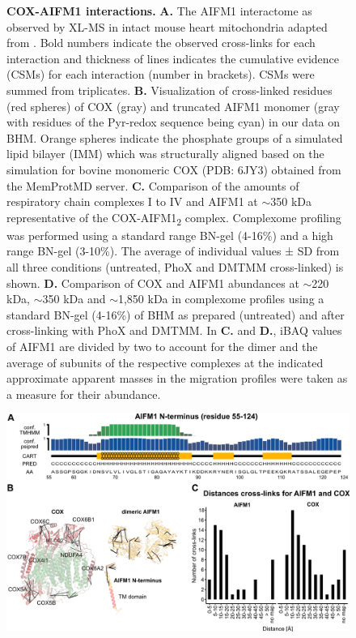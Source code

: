 \begin{subappendices}
\begin{figure}[htb]
		\caption{\textbf{COX-AIFM1 interactions.} \textbf{A.} The AIFM1 interactome as observed by XL-MS in intact mouse heart mitochondria adapted from \cite{RN16}. Bold numbers indicate the observed cross-links for each interaction and thickness of lines indicates the cumulative evidence (CSMs) for each interaction (number in brackets). CSMs were summed from triplicates. \textbf{B.} Visualization of cross-linked residues (red spheres) of COX (gray) and truncated AIFM1 monomer (gray with residues of the Pyr-redox sequence being cyan) in our data on BHM. Orange spheres indicate the phosphate groups of a simulated lipid bilayer (IMM) which was structurally aligned based on the simulation for bovine monomeric COX (PDB: 6JY3) obtained from the MemProtMD server. \textbf{C.} Comparison of the amounts of respiratory chain complexes I to IV and AIFM1 at $\sim$350 kDa representative of the COX-AIFM1\textsubscript{2} complex. Complexome profiling was performed using a standard range BN-gel (4-16\%) and a high range BN-gel (3-10\%). The average of individual values ± SD from all three conditions (untreated, PhoX and DMTMM cross-linked) is shown. \textbf{D.} Comparison of COX and AIFM1 abundances at $\sim$220 kDa, $\sim$350 kDa and $\sim$1,850 kDa in complexome profiles using a standard BN-gel (4-16\%) of BHM as prepared (untreated) and after cross-linking with PhoX and DMTMM. In \textbf{C.} and \textbf{D.}, iBAQ values of AIFM1 are divided by two to account for the dimer and the average of subunits of the respective complexes at the indicated approximate apparent masses in the migration profiles were taken as a measure for their abundance.}
		\label{fig:ch3_app_fig2}
	\end{figure}
	\begin{figure}[htb]
		\center
		\includegraphics[]{Chapter.3/Figures/SI_Figure3.png}

\end{figure}
\end{subappendices}
